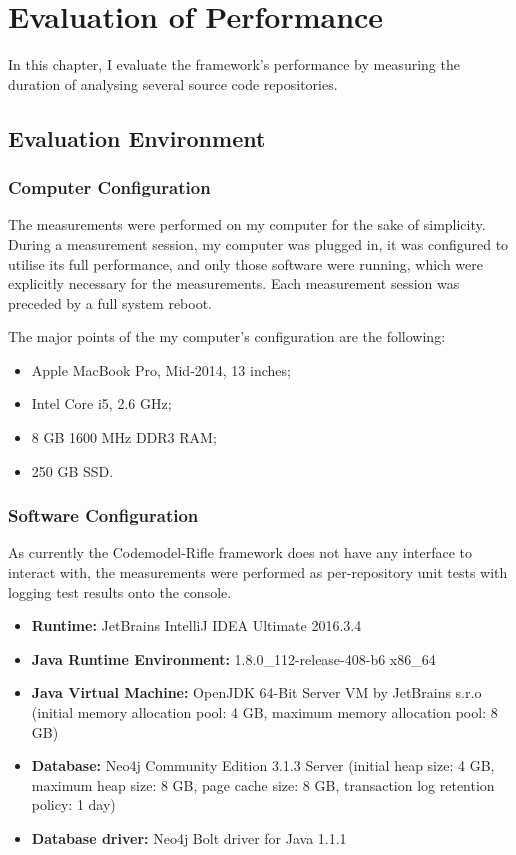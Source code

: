 \chapter{Evaluation of Performance}
\label{chapter:evaluation}

In this chapter, I evaluate the framework's performance by measuring the duration of analysing several source code repositories.


\section{Evaluation Environment}

\subsection{Computer Configuration}

The measurements were performed on my computer for the sake of simplicity. During a measurement session, my computer was plugged in, it was configured to utilise its full performance, and only those software were running, which were explicitly necessary for the measurements. Each measurement session was preceded by a full system reboot.

The major points of the my computer's configuration are the following:

\begin{itemize}
\item Apple MacBook Pro, Mid-2014, 13 inches;
\item Intel Core i5, 2.6 GHz;
\item 8 GB 1600 MHz DDR3 RAM;
\item 250 GB SSD.
\end{itemize}


\subsection{Software Configuration}

As currently the Codemodel-Rifle framework does not have any interface to interact with, the measurements were performed as per-repository unit tests with logging test results onto the console.

\begin{itemize}
\item \textbf{Runtime:} JetBrains IntelliJ IDEA Ultimate 2016.3.4
\item \textbf{Java Runtime Environment:} 1.8.0\_112-release-408-b6 x86\_64
\item \textbf{Java Virtual Machine:} OpenJDK 64-Bit Server VM by JetBrains s.r.o (initial memory allocation pool: 4 GB, maximum memory allocation pool: 8 GB)
\item \textbf{Database:} Neo4j Community Edition 3.1.3 Server (initial heap size: 4 GB, maximum heap size: 8 GB, page cache size: 8 GB, transaction log retention policy: 1 day)
\item \textbf{Database driver:} Neo4j Bolt driver for Java 1.1.1
\end{itemize}

